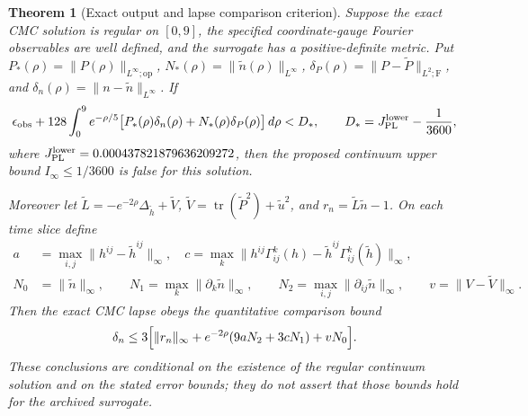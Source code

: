 \documentclass[11pt,a4paper]{article}
\newtheorem{theorem}{Theorem}[section]
\theoremstyle{remark}
\newcommand{\op}{\mathrm{op}}
\newcommand{\tr}{\operatorname{tr}}
\begin{document}
\begin{theorem}[Exact output and lapse comparison criterion]\label{thm:newcontinuum}
Suppose the exact CMC solution is regular on $[0,9]$, the specified coordinate-gauge Fourier observables are well defined, and the surrogate has a positive-definite metric. Put
$P_*(\rho)=\|P(\rho)\|_{L^\infty;\op}$,
$N_*(\rho)=\|\widetilde n(\rho)\|_{L^\infty}$,
$\delta_P(\rho)=\|P-\widetilde P\|_{L^2;\mathrm F}$, and
$\delta_n(\rho)=\|n-\widetilde n\|_{L^\infty}$.
If
\begin{equation}\label{eq:newgategen}
\epsilon_{\rm obs}+
128\int_0^9e^{-\rho/5}
\bigl[P_*(\rho)\delta_n(\rho)+N_*(\rho)\delta_P(\rho)\bigr]\,d\rho
<D_*,\qquad D_*=J_{\rm PL}^{\rm lower}-\frac1{3600},
\end{equation}
where $J_{\rm PL}^{\rm lower}=0.000437821879636209272$, then the proposed continuum upper bound $I_\infty\le1/3600$ is false for this solution.

Moreover let $\widetilde L=-e^{-2\rho}\Delta_{\widetilde h}+\widetilde V$, $\widetilde V=\tr(\widetilde P^2)+\widetilde u^2$, and $r_n=\widetilde L\widetilde n-1$. On each time slice define
\begin{align*}
a&=\max_{i,j}\|h^{ij}-\widetilde h^{ij}\|_\infty,\quad
c=\max_k\|h^{ij}\Gamma^k_{ij}(h)-\widetilde h^{ij}\Gamma^k_{ij}(\widetilde h)\|_\infty,\\
N_0&=\|\widetilde n\|_\infty,\qquad
N_1=\max_k\|\partial_k\widetilde n\|_\infty,\qquad
N_2=\max_{i,j}\|\partial_{ij}\widetilde n\|_\infty,\qquad
v=\|V-\widetilde V\|_\infty.
\end{align*}
Then the exact CMC lapse obeys the quantitative comparison bound
\begin{equation}\label{eq:newlapsegate}
\delta_n\le3\Bigl[\|r_n\|_\infty+
 e^{-2\rho}(9aN_2+3cN_1)+vN_0\Bigr].
\end{equation}
These conclusions are conditional on the existence of the regular continuum solution and on the stated error bounds; they do not assert that those bounds hold for the archived surrogate.
\end{theorem}
\end{document}
